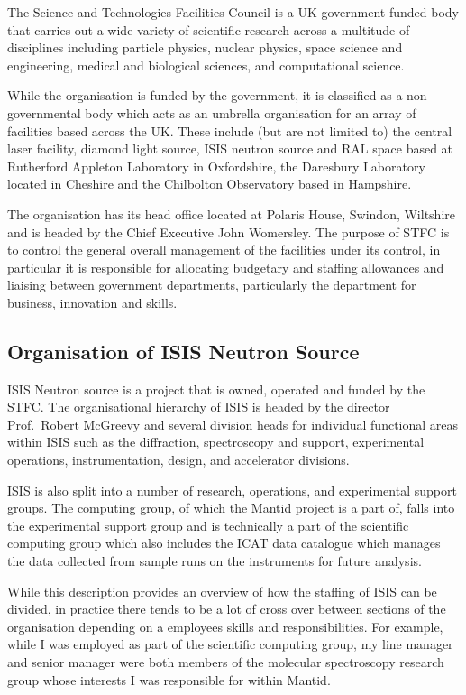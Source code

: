 \documentclass[paper=a4, fontsize=11pt]{scrartcl}	%
\numberwithin{equation}{section}															%
\numberwithin{figure}{section}																%
\numberwithin{table}{section}
\begin{document}
The Science and Technologies Facilities Council is a UK government
funded body that carries out a wide variety of scientific research
across a multitude of disciplines including particle physics, nuclear
physics, space science and engineering, medical and biological sciences,
and computational science.

While the organisation is funded by the government, it is classified as
a non-governmental body which acts as an umbrella organisation for an
array of facilities based across the UK. These include (but are not
limited to) the central laser facility, diamond light source, ISIS
neutron source and RAL space based at Rutherford Appleton Laboratory in
Oxfordshire, the Daresbury Laboratory located in Cheshire and the
Chilbolton Observatory based in Hampshire.

The organisation has its head office located at Polaris House, Swindon,
Wiltshire and is headed by the Chief Executive John Womersley. The
purpose of STFC is to control the general overall management of the
facilities under its control, in particular it is responsible for
allocating budgetary and staffing allowances and liaising between
government departments, particularly the department for business,
innovation and skills.

\subsection{Organisation of ISIS Neutron
Source}\label{organisation-of-isis-neutron-source}

ISIS Neutron source is a project that is owned, operated and funded by
the STFC. The organisational hierarchy of ISIS is headed by the director
Prof.~Robert McGreevy and several division heads for individual
functional areas within ISIS such as the diffraction, spectroscopy and
support, experimental operations, instrumentation, design, and
accelerator divisions.

ISIS is also split into a number of research, operations, and
experimental support groups. The computing group, of which the Mantid
project is a part of, falls into the experimental support group and is
technically a part of the scientific computing group which also includes
the ICAT data catalogue which manages the data collected from sample
runs on the instruments for future analysis.

While this description provides an overview of how the staffing of ISIS
can be divided, in practice there tends to be a lot of cross over
between sections of the organisation depending on a employees skills and
responsibilities. For example, while I was employed as part of the
scientific computing group, my line manager and senior manager were both
members of the molecular spectroscopy research group whose interests I
was responsible for within Mantid.
\end{document}
